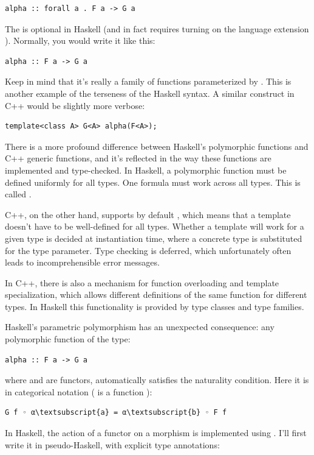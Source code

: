 \begin{verbatim}
alpha :: forall a . F a -> G a
\end{verbatim}
The  is optional in Haskell (and in fact requires
turning on the language extension ). Normally,
you would write it like this:

\begin{verbatim}
alpha :: F a -> G a
\end{verbatim}
Keep in mind that it's really a family of functions parameterized by
. This is another example of the terseness of the Haskell
syntax. A similar construct in C++ would be slightly more verbose:

\begin{verbatim}
template<class A> G<A> alpha(F<A>);
\end{verbatim}
There is a more profound difference between Haskell's polymorphic
functions and C++ generic functions, and it's reflected in the way these
functions are implemented and type-checked. In Haskell, a polymorphic
function must be defined uniformly for all types. One formula must work
across all types. This is called .

C++, on the other hand, supports by default ,
which means that a template doesn't have to be well-defined for all
types. Whether a template will work for a given type is decided at
instantiation time, where a concrete type is substituted for the type
parameter. Type checking is deferred, which unfortunately often leads to
incomprehensible error messages.

In C++, there is also a mechanism for function overloading and template
specialization, which allows different definitions of the same function
for different types. In Haskell this functionality is provided by type
classes and type families.

Haskell's parametric polymorphism has an unexpected consequence: any
polymorphic function of the type:

\begin{verbatim}
alpha :: F a -> G a
\end{verbatim}
where  and  are functors, automatically satisfies
the naturality condition. Here it is in categorical notation (
is a function ):

\begin{Verbatim}[commandchars=\\\{\}]
G f ◦ α\textsubscript{a} = α\textsubscript{b} ◦ F f
\end{Verbatim}
In Haskell, the action of a functor  on a morphism 
is implemented using . I'll first write it in
pseudo-Haskell, with explicit type annotations:

